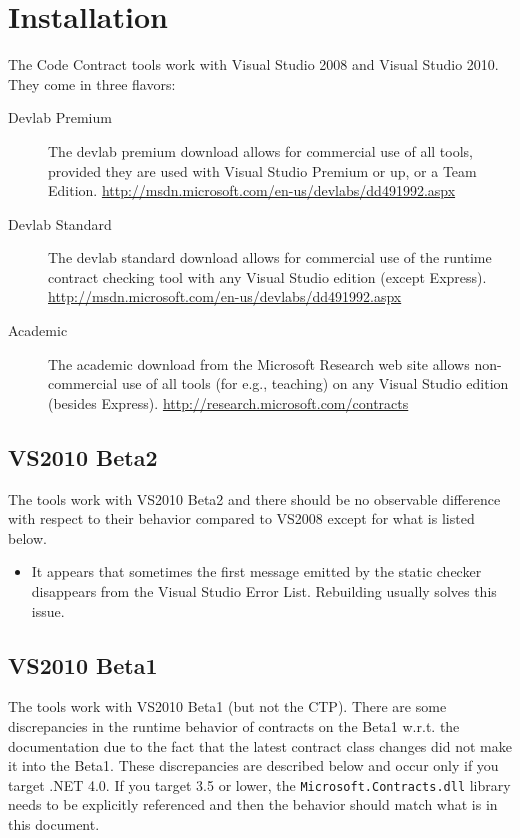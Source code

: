 \documentclass{article}
\newcommand{\code}[1]{\lstinline{#1}}
\begin{document}
\section{Installation}
The Code Contract tools work with Visual Studio 2008 and Visual Studio 2010.
They come in three flavors:
\begin{description}
\item[Devlab Premium] The devlab premium download allows for commercial use of all
  tools, provided they are used with Visual Studio Premium or up, or a
  Team Edition.
  \url{http://msdn.microsoft.com/en-us/devlabs/dd491992.aspx}

\item[Devlab Standard] The devlab standard download allows for
  commercial use of the runtime contract checking tool with any Visual
  Studio edition (except Express).
  \url{http://msdn.microsoft.com/en-us/devlabs/dd491992.aspx}

\item[Academic] The academic download from the Microsoft Research web
  site allows non-commercial use of all tools (for e.g., teaching) on any Visual Studio
  edition (besides Express).
  \url{http://research.microsoft.com/contracts}
\end{description}


\subsection{VS2010 Beta2}
The tools work with VS2010 Beta2 and there should be no observable
difference with respect to their behavior compared to VS2008 except
for what is listed below. 
\begin{itemize}
\item It appears that sometimes the first message emitted by the
  static checker disappears from the Visual Studio Error
  List. Rebuilding usually solves this issue.
\end{itemize}

\subsection{VS2010 Beta1}
The tools work with VS2010 Beta1 (but not the CTP). There are some
discrepancies in the runtime behavior of contracts on the Beta1 w.r.t.
the documentation due to
the fact that the latest contract class changes did not make it into
the Beta1. These discrepancies are described below and occur only if
you target .NET 4.0. If you target 3.5 or lower, the \code{Microsoft.Contracts.dll} library
needs to be explicitly referenced and then the behavior should match
what is in this document.
\end{document}
